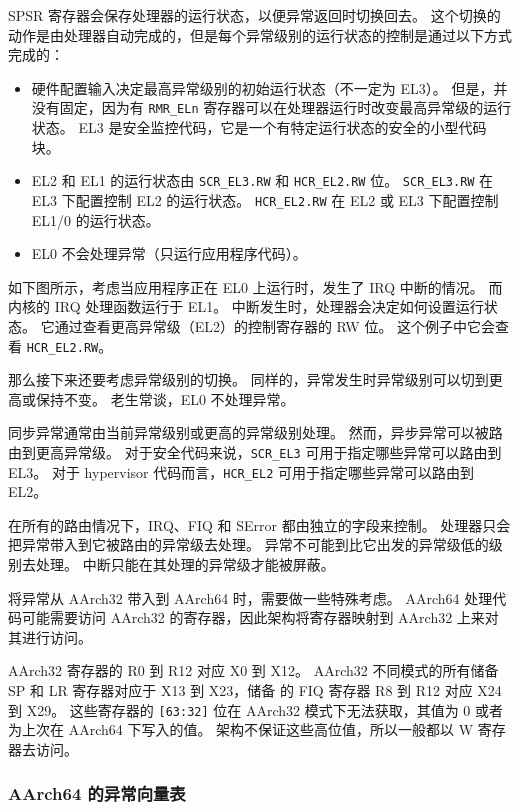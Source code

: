 SPSR 寄存器会保存处理器的运行状态，以便异常返回时切换回去。
这个切换的动作是由处理器自动完成的，但是每个异常级别的运行状态的控制是通过以下方式完成的：

\begin{itemize}
  \item 硬件配置输入决定最高异常级别的初始运行状态（不一定为 EL3）。
    但是，并没有固定，因为有 \lstinline!RMR_ELn! 寄存器可以在处理器运行时改变最高异常级的运行状态。
    EL3 是安全监控代码，它是一个有特定运行状态的安全的小型代码块。
  \item EL2 和 EL1 的运行状态由 \lstinline!SCR_EL3.RW! 和 \lstinline!HCR_EL2.RW! 位。
    \lstinline!SCR_EL3.RW! 在 EL3 下配置控制 EL2 的运行状态。
    \lstinline!HCR_EL2.RW! 在 EL2 或 EL3 下配置控制 EL1/0 的运行状态。
  \item EL0 不会处理异常（只运行应用程序代码）。
\end{itemize}

如下图所示，考虑当应用程序正在 EL0 上运行时，发生了 IRQ 中断的情况。
而内核的 IRQ 处理函数运行于 EL1。
中断发生时，处理器会决定如何设置运行状态。
它通过查看更高异常级（EL2）的控制寄存器的 RW 位。
这个例子中它会查看 \lstinline!HCR_EL2.RW!。


那么接下来还要考虑异常级别的切换。
同样的，异常发生时异常级别可以切到更高或保持不变。
老生常谈，EL0 不处理异常。

同步异常通常由当前异常级别或更高的异常级别处理。
然而，异步异常可以被路由到更高异常级。
对于安全代码来说，\lstinline!SCR_EL3! 可用于指定哪些异常可以路由到 EL3。
对于 hypervisor 代码而言，\lstinline!HCR_EL2! 可用于指定哪些异常可以路由到 EL2。

在所有的路由情况下，IRQ、FIQ 和 SError 都由独立的字段来控制。
处理器只会把异常带入到它被路由的异常级去处理。
异常不可能到比它出发的异常级低的级别去处理。
中断只能在其处理的异常级才能被屏蔽。

将异常从 AArch32 带入到 AArch64 时，需要做一些特殊考虑。
AArch64 处理代码可能需要访问 AArch32 的寄存器，因此架构将寄存器映射到 AArch32 上来对其进行访问。

AArch32 寄存器的 R0 到 R12 对应 X0 到 X12。
AArch32 不同模式的所有储备 SP 和 LR 寄存器对应于 X13 到 X23，储备 的 FIQ 寄存器 R8 到 R12 对应 X24 到 X29。
这些寄存器的 \verb![63:32]! 位在 AArch32 模式下无法获取，其值为 0 或者为上次在 AArch64 下写入的值。
架构不保证这些高位值，所以一般都以 W 寄存器去访问。

\subsubsection{AArch64 的异常向量表}

